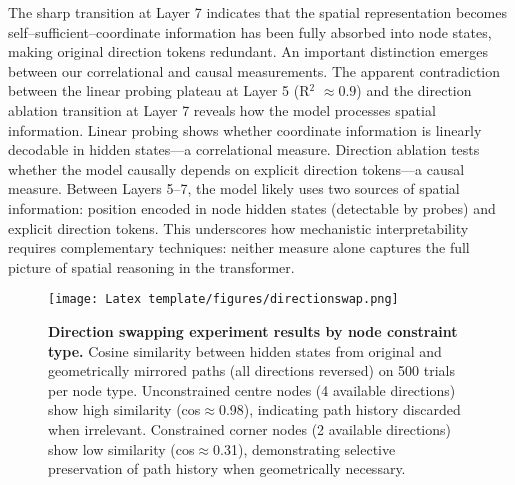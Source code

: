 The sharp transition at Layer 7 indicates that the spatial representation becomes self--sufficient--coordinate information has been fully absorbed into node states, making original direction tokens redundant. An important distinction emerges between our correlational and causal measurements. The apparent contradiction between the linear probing plateau at Layer 5 (R$^2$ $\approx 0.9$) and the direction ablation transition at Layer 7 reveals how the model processes spatial information. Linear probing shows whether coordinate information is linearly decodable in hidden states—a correlational measure. Direction ablation tests whether the model causally depends on explicit direction tokens—a causal measure. Between Layers 5--7, the model likely uses two sources of spatial information: position encoded in node hidden states (detectable by probes) and explicit direction tokens. This underscores how mechanistic interpretability requires complementary techniques: neither measure alone captures the full picture of spatial reasoning in the transformer.





\begin{figure}[h]
\centering
\texttt{[image: Latex template/figures/directionswap.png]}
\caption[Direction swapping experiment results by node constraint type.]{\textbf{Direction swapping experiment results by node constraint type.} Cosine similarity between hidden states from original and geometrically mirrored paths (all directions reversed) on 500 trials per node type. Unconstrained centre nodes (4 available directions) show high similarity (cos$\approx$0.98), indicating path history discarded when irrelevant. Constrained corner nodes (2 available directions) show low similarity (cos$\approx$0.31), demonstrating selective preservation of path history when geometrically necessary.}
\label{fig:direction_swapping}
\end{figure}



